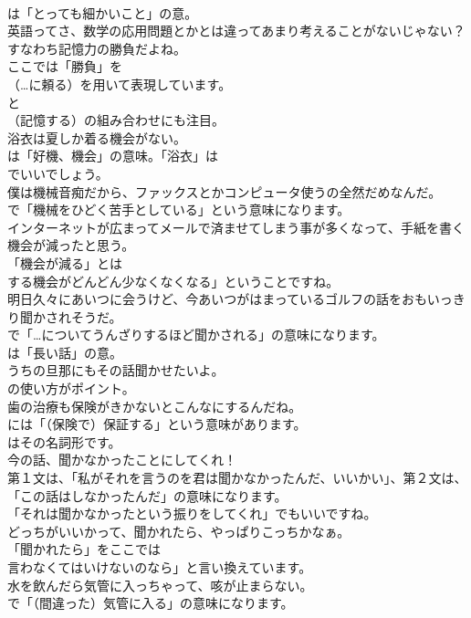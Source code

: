 \documentclass[8pt]{extreport}
\begin{document}
\begin{CJK}{UTF8}{min}
\\	は「とっても細かいこと」の意。	
\\	英語ってさ、数学の応用問題とかとは違ってあまり考えることがないじゃない？すなわち記憶力の勝負だよね。 
\\	ここでは「勝負」を 
\\	（…に頼る）を用いて表現しています。
\\	と 
\\	（記憶する）の組み合わせにも注目。	
\\	浴衣は夏しか着る機会がない。 
\\	は「好機、機会」の意味。「浴衣」は 
\\	でいいでしょう。	
\\	僕は機械音痴だから、ファックスとかコンピュータ使うの全然だめなんだ。 
\\	で「機械をひどく苦手としている」という意味になります。	
\\	インターネットが広まってメールで済ませてしまう事が多くなって、手紙を書く機会が減ったと思う。 
\\	「機会が減る」とは
\\	する機会がどんどん少なくなくなる」ということですね。	
\\	明日久々にあいつに会うけど、今あいつがはまっているゴルフの話をおもいっきり聞かされそうだ。 
\\	で「…についてうんざりするほど聞かされる」の意味になります。
\\	は「長い話」の意。	
\\	うちの旦那にもその話聞かせたいよ。 
\\	の使い方がポイント。	
\\	歯の治療も保険がきかないとこんなにするんだね。 
\\	には「（保険で）保証する」という意味があります。
\\	はその名詞形です。	
\\	今の話、聞かなかったことにしてくれ！ 
\\	第１文は、「私がそれを言うのを君は聞かなかったんだ、いいかい」、第２文は、「この話はしなかったんだ」の意味になります。
\\	「それは聞かなかったという振りをしてくれ」でもいいですね。	
\\	どっちがいいかって、聞かれたら、やっぱりこっちかなぁ。 
\\	「聞かれたら」をここでは
\\	言わなくてはいけないのなら」と言い換えています。	
\\	水を飲んだら気管に入っちゃって、咳が止まらない。 
\\	で「（間違った）気管に入る」の意味になります。	

\end{CJK}
\end{document}
